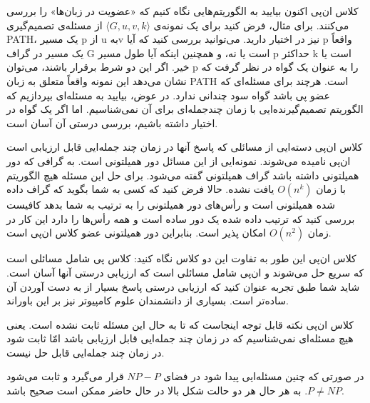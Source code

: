 \begin{itemframe}{کلاس ان‌پی}
\itm
اکنون بیایید به الگوریتم‌هایی نگاه کنیم که «عضویت در زبان‌ها» را بررسی می‌کنند.
برای مثال، فرض کنید برای یک نمونه‌ی
$\langle G, u, v, k \rangle$
از مسئله‌ی تصمیم‌گیری PATH،
یک مسیر p از u بهv نیز در اختیار دارید.
می‌توانید بررسی کنید که آیا p واقعاً یک مسیر در گراف G است یا نه، و همچنین اینکه آیا طول مسیر p حداکثر k است یا خیر.
\itm
اگر این دو شرط برقرار باشند، می‌توان p را به عنوان یک گواه
در نظر گرفت که نشان می‌دهد این نمونه واقعاً متعلق به زبان PATH است.
\itm
هرچند برای مسئله‌ای که عضو پی باشد گواه سود چندانی ندارد.
در عوض، بیایید به مسئله‌ای بپردازیم که الگوریتم تصمیم‌گیرنده‌ایی با زمان چندجمله‌ای برای آن نمی‌شناسیم. اما اگر یک گواه در اختیار داشته باشیم، بررسی درستی آن آسان است.
\end{itemframe}


\begin{itemframe}{کلاس ان‌پی}
\itm
دسته‌ایی از مسائلی که پاسخ آنها در زمان چند جمله‌ایی قابل ارزیابی است ان‌پی نامیده می‌شوند. نمونه‌ایی از این مسائل دور همیلتونی است. به گرافی که دور همیلتونی داشته باشد گراف همیلتونی
 گفته می‌شود.
\itm
برای حل این مسئله هیچ الگوریتم با زمان
$O(n^k)$
یافت نشده.
\itm
حالا فرض کنید که کسی به شما بگوید که گراف داده شده همیلتونی است و رأس‌های دور همیلتونی را به ترتیب به شما بدهد کافیست بررسی کنید که ترتیب داده شده یک دور ساده است و همه رأس‌ها را دارد این کار در زمان
$O(n^2)$
امکان پذیر است. بنابراین دور همیلتونی عضو کلاس ان‌پی است.
\end{itemframe}


\begin{itemframe}{کلاس ان‌پی}
\itm
این طور به تفاوت این دو کلاس نگاه کنید:‌ کلاس پی شامل مسائلی است که سریع حل می‌شوند و ان‌پی شامل مسائلی است که ارزیابی درستی آنها آسان است.
\itm
شاید شما طبق تجربه عنوان کنید که ارزیابی درستی پاسخ بسیار از به دست آوردن آن ساده‌تر است. بسیاری از دانشمندان علوم کامپیوتر نیز بر این باوراند.
\end{itemframe}


\begin{itemframe}{کلاس ان‌پی}
\itm
نکته قابل توجه اینجاست که تا به حال این مسئله ثابت نشده است. یعنی هیچ مسئله‌ای نمی‌شناسیم که در زمان چند جمله‌ایی قابل ارزیابی باشد امّا ثابت شود در زمان چند جمله‌ایی قابل حل نیست.

\itm
در صورتی که چنین مسئله‌ایی پیدا شود در فضای
$NP - P$
قرار می‌گیرد و ثابت می‌شود
$P \neq NP$.
به هر حال هر دو حالت شکل بالا در حال حاضر ممکن است صحیح باشد.
\end{itemframe}

